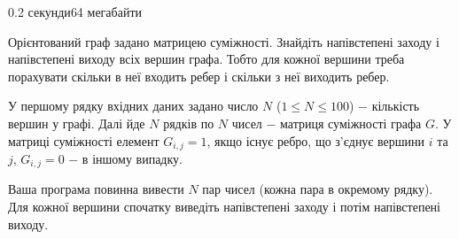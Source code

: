 \begin{problem}{}{}{}{0.2 секунди}{64 мегабайти}

Орієнтований граф задано матрицею суміжності. Знайдіть напівстепені заходу і напівстепені виходу всіх вершин графа.
Тобто для кожної вершини треба порахувати скільки в неї входить ребер і скільки з неї виходить ребер.

\InputFile
У першому рядку вхідних даних задано число $N$ ($1 \le N \le 100$) $-$ кількість вершин у графі.
Далі йде $N$ рядків по $N$ чисел $-$ матриця суміжності графа $G$. У матриці суміжності елемент $G_{i,j}=1$, якщо
існує ребро, що з'єднує вершини $i$ та $j$, $G_{i,j}=0$ $-$ в іншому випадку.

\OutputFile
Ваша програма повинна вивести $N$ пар чисел (кожна пара в окремому рядку). Для кожної вершини спочатку виведіть 
напівстепені заходу і потім напівстепені виходу.

\Example

\begin{example}
%
\end{example}

\end{problem}

